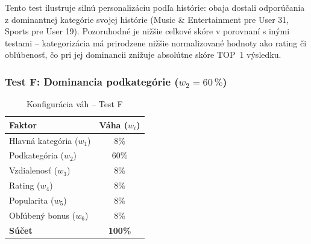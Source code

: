Tento test ilustruje silnú personalizáciu podľa histórie: obaja dostali odporúčania z dominantnej kategórie svojej histórie (Music \& Entertainment pre User 31, Sports pre User 19). Pozoruhodné je nižšie celkové skóre v porovnaní s inými testami – kategorizácia má prirodzene nižšie normalizované hodnoty ako rating či obľúbenosť, čo pri jej dominancii znižuje absolútne skóre TOP~1 výsledku.

\subsubsection{Test F: Dominancia podkategórie ($w_2 = 60\,\%$)}

\begin{table}[H]
\centering
\caption{Konfigurácia váh – Test F}
\label{tab:vahy_testF}
\begin{tabular}{|l|c|}
\hline
\textbf{Faktor} & \textbf{Váha ($w_i$)} \\ \hline
Hlavná kategória ($w_1$) & 8\% \\
Podkategória ($w_2$)     & 60\% \\
Vzdialenosť ($w_3$)      & 8\% \\
Rating ($w_4$)           & 8\% \\
Popularita ($w_5$)       & 8\% \\
Obľúbený bonus ($w_6$)   & 8\% \\ \hline
\textbf{Súčet}           & \textbf{100\%} \\ \hline
\end{tabular}
\end{table}

